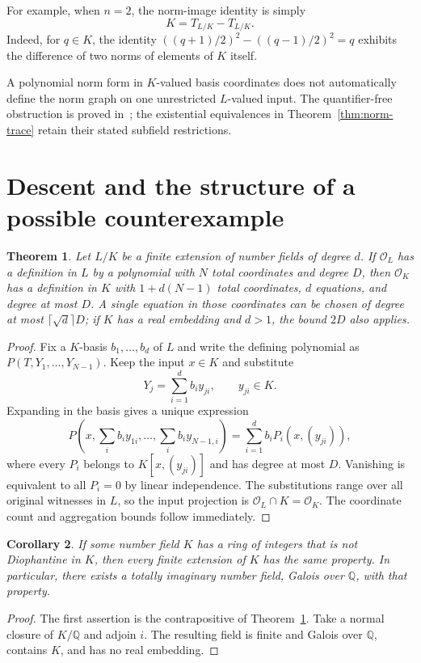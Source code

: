 \documentclass[11pt,a4paper]{article}
\newtheorem{theorem}{Theorem}[section]
\newtheorem{corollary}[theorem]{Corollary}
\theoremstyle{definition}
\newcommand{\Q}{\mathbb Q}
\newcommand{\OK}{\mathcal O_K}
\newcommand{\OL}{\mathcal O_L}
\begin{document}
For example, when $n=2$, the norm-image identity is simply
\[
                         K=T_{L/K}-T_{L/K}.
\]
Indeed, for $q\in K$, the identity
$((q+1)/2)^2-((q-1)/2)^2=q$ exhibits the difference of two norms
of elements of $K$ itself.

A polynomial norm form in $K$-valued basis coordinates does not
automatically define the norm graph on one unrestricted $L$-valued
input. The quantifier-free obstruction is proved in~\cite{NormGraphs};
the existential equivalences in Theorem~\ref{thm:norm-trace} retain
their stated subfield restrictions.

\section{Descent and the structure of a possible counterexample}

\begin{theorem}\label{thm:descent}
Let $L/K$ be a finite extension of number fields of degree $d$.
If $\OL$ has a definition in $L$ by a polynomial with $N$ total
coordinates and degree $D$, then $\OK$ has a definition in $K$
with $1+d(N-1)$ total coordinates, $d$ equations, and degree at
most $D$. A single equation in those coordinates can be chosen
of degree at most $\lceil\sqrt d\rceil D$; if $K$ has a real
embedding and $d>1$, the bound $2D$ also applies.
\end{theorem}
\begin{proof}
Fix a $K$-basis $b_1,\ldots,b_d$ of $L$ and write the defining
polynomial as $P(T,Y_1,\ldots,Y_{N-1})$.
Keep the input $x\in K$ and substitute
\[
                     Y_j=\sum_{i=1}^d b_i y_{ji},
                     \qquad y_{ji}\in K.
\]
Expanding in the basis gives a unique expression
\[
 P\left(x,\sum_i b_i y_{1i},\ldots,\sum_i b_i y_{N-1,i}\right)
                 =\sum_{i=1}^d b_i P_i(x,(y_{ji})),
\]
where every $P_i$ belongs to $K[x,(y_{ji})]$ and has degree at
most $D$. Vanishing is equivalent to all $P_i=0$ by linear
independence. The substitutions range over all original witnesses
in $L$, so the input projection is $\OL\cap K=\OK$.
The coordinate count and aggregation bounds follow immediately.
\end{proof}

\begin{corollary}\label{cor:counterexample}
If some number field $K$ has a ring of integers that is not
Diophantine in $K$, then every finite extension of $K$ has the
same property. In particular, there exists a totally imaginary
number field, Galois over $\Q$, with that property.
\end{corollary}
\begin{proof}
The first assertion is the contrapositive of
Theorem~\ref{thm:descent}. Take a normal closure of $K/\Q$
and adjoin $i$. The resulting field is finite and Galois over
$\Q$, contains $K$, and has no real embedding.
\end{proof}
\end{document}
